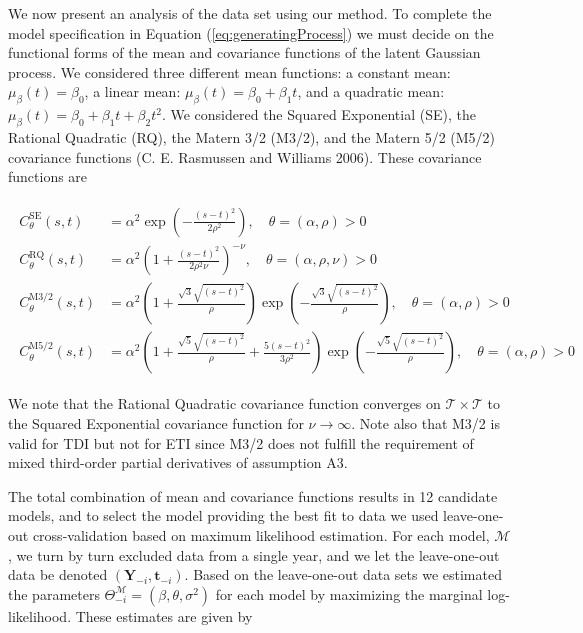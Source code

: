 \documentclass[11pt,]{article}
\theoremstyle{nonumberplain}
\begin{document}
We now present an analysis of the data set using our method. To complete
the model specification in Equation (\ref{eq:generatingProcess}) we must
decide on the functional forms of the mean and covariance functions of
the latent Gaussian process. We considered three different mean
functions: a constant mean: \(\mu_\beta(t) = \beta_0\), a linear mean:
\(\mu_\beta(t) = \beta_0 + \beta_1 t\), and a quadratic mean:
\(\mu_\beta(t) = \beta_0 + \beta_1 t + \beta_2 t^2\). We considered the
Squared Exponential (SE), the Rational Quadratic (RQ), the Matern 3/2
(M3/2), and the Matern 5/2 (M5/2) covariance functions (C. E. Rasmussen
and Williams 2006). These covariance functions are

\begin{align}
\begin{split}
  C_\theta^\text{SE}(s, t) &= \alpha^2\exp\left(-\frac{(s-t)^2}{2\rho^2}\right), \quad \theta = (\alpha, \rho) > 0\\ 
  C_\theta^\text{RQ}(s, t) &= \alpha^2\left(1 + \frac{(s-t)^2}{2\rho^2\nu}\right)^{-\nu}, \quad \theta = (\alpha, \rho, \nu) > 0\\
  C_\theta^\text{M3/2}(s, t) &= \alpha^2\left(1 + \frac{\sqrt{3}\sqrt{(s-t)^2}}{\rho}\right)\exp\left(-\frac{\sqrt{3}\sqrt{(s-t)^2}}{\rho}\right), \quad \theta = (\alpha, \rho) > 0\\
  C_\theta^\text{M5/2}(s, t) &= \alpha^2\left(1 + \frac{\sqrt{5}\sqrt{(s-t)^2}}{\rho} + \frac{5(s-t)^2}{3\rho^2}\right)\exp\left(-\frac{\sqrt{5}\sqrt{(s-t)^2}}{\rho}\right), \quad \theta = (\alpha, \rho)  > 0
\end{split}
\label{eq:covariancefunctions}
\end{align}

We note that the Rational Quadratic covariance function converges on
\(\mathcal{T} \times \mathcal{T}\) to the Squared Exponential covariance
function for \(\nu \rightarrow \infty\). Note also that M3/2 is valid
for TDI but not for ETI since M3/2 does not fulfill the requirement of
mixed third-order partial derivatives of assumption A3.

The total combination of mean and covariance functions results in 12
candidate models, and to select the model providing the best fit to data
we used leave-one-out cross-validation based on maximum likelihood
estimation. For each model, \(\mathcal{M}\), we turn by turn excluded
data from a single year, and we let the leave-one-out data be denoted
\((\mathbf{Y}_{-i}, \mathbf{t}_{-i})\). Based on the leave-one-out data
sets we estimated the parameters
\(\Theta_{-i}^{\mathcal{M}} = (\beta, \theta, \sigma^2)\) for each model
by maximizing the marginal log-likelihood. These estimates are given by
\end{document}
